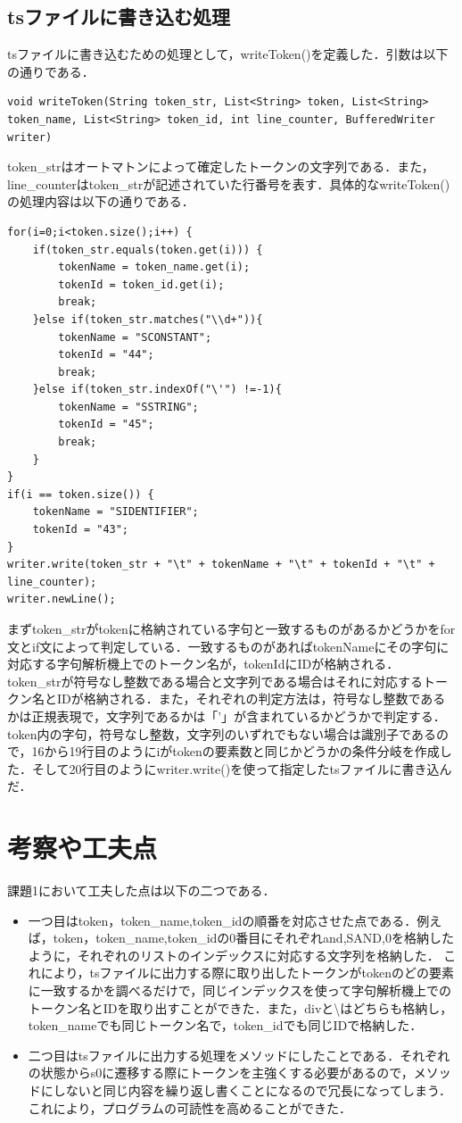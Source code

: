 \documentclass[dvipdfmx]{jarticle}
\begin{document}
\subsection{tsファイルに書き込む処理}
tsファイルに書き込むための処理として，writeToken()を定義した．引数は以下の通りである．
\begin{lstlisting}
void writeToken(String token_str, List<String> token, List<String> token_name, List<String> token_id, int line_counter, BufferedWriter writer)
\end{lstlisting}
token\_strはオートマトンによって確定したトークンの文字列である．また，line\_counterはtoken\_strが記述されていた行番号を表す．具体的なwriteToken()の処理内容は以下の通りである．
\begin{lstlisting}
for(i=0;i<token.size();i++) {
    if(token_str.equals(token.get(i))) {
        tokenName = token_name.get(i);
        tokenId = token_id.get(i);
        break;
    }else if(token_str.matches("\\d+")){
        tokenName = "SCONSTANT";
        tokenId = "44";
        break;
    }else if(token_str.indexOf("\'") !=-1){
        tokenName = "SSTRING";
        tokenId = "45";
        break;
    }
}
if(i == token.size()) {
    tokenName = "SIDENTIFIER";
    tokenId = "43";
}
writer.write(token_str + "\t" + tokenName + "\t" + tokenId + "\t" + line_counter);
writer.newLine();
\end{lstlisting}
まずtoken\_strがtokenに格納されている字句と一致するものがあるかどうかをfor文とif文によって判定している．一致するものがあればtokenNameにその字句に対応する字句解析機上でのトークン名が，tokenIdにIDが格納される．
token\_strが符号なし整数である場合と文字列である場合はそれに対応するトークン名とIDが格納される．また，それぞれの判定方法は，符号なし整数であるかは正規表現で，文字列であるかは「'」が含まれているかどうかで判定する．
token内の字句，符号なし整数，文字列のいずれでもない場合は識別子であるので，16から19行目のようにiがtokenの要素数と同じかどうかの条件分岐を作成した．そして20行目のようにwriter.write()を使って指定したtsファイルに書き込んだ．
\section{考察や工夫点}
課題1において工夫した点は以下の二つである．
\begin{itemize}
    \item 一つ目はtoken，token\_name,token\_idの順番を対応させた点である．例えば，token，token\_name,token\_idの0番目にそれぞれand,SAND,0を格納したように，それぞれのリストのインデックスに対応する文字列を格納した．
    これにより，tsファイルに出力する際に取り出したトークンがtokenのどの要素に一致するかを調べるだけで，同じインデックスを使って字句解析機上でのトークン名とIDを取り出すことができた．また，divと\textbackslash はどちらも格納し，token\_nameでも同じトークン名で，token\_idでも同じIDで格納した．
    \item 二つ目はtsファイルに出力する処理をメソッドにしたことである．それぞれの状態からs0に遷移する際にトークンを主強くする必要があるので，メソッドにしないと同じ内容を繰り返し書くことになるので冗長になってしまう．これにより，プログラムの可読性を高めることができた．
\end{itemize}
\end{document}
